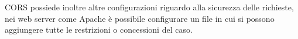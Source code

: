 CORS possiede inoltre altre configurazioni riguardo alla sicurezza delle richieste, nei web server come Apache è possibile configurare un file in cui si possono aggiungere tutte le restrizioni o concessioni del caso.

%
%    

